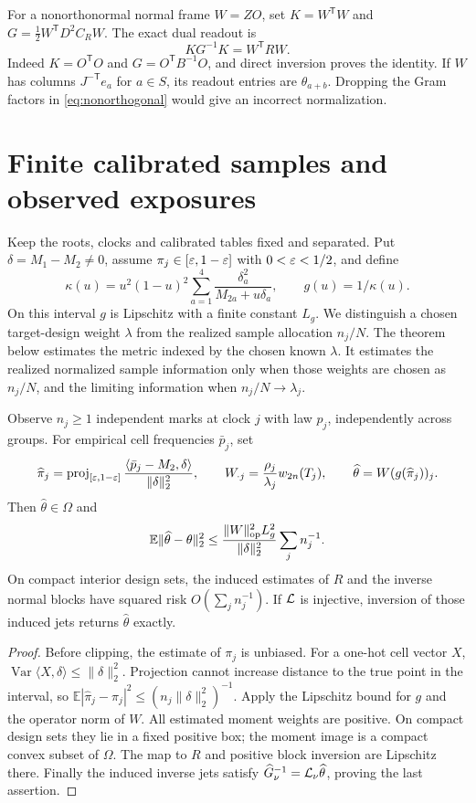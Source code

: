 For a nonorthonormal normal frame $W=ZO$, set $K=W^{\mathsf T}W$ and $G=\tfrac12W^{\mathsf T}D^2C_RW$. The exact dual readout is
\begin{equation}\label{eq:nonorthogonal}
 KG^{-1}K=W^{\mathsf T}RW.
\end{equation}
Indeed $K=O^{\mathsf T}O$ and $G=O^{\mathsf T}B^{-1}O$, and direct inversion proves the identity. If $W$ has columns $J^{-\mathsf T}e_a$ for $a\in S$, its readout entries are $\theta_{a+b}$. Dropping the Gram factors in \eqref{eq:nonorthogonal} would give an incorrect normalization.

\section{Finite calibrated samples and observed exposures}\label{app:raw}
Keep the roots, clocks and calibrated tables fixed and separated. Put $\delta=M_1-M_2\ne0$, assume $\pi_j\in[\varepsilon,1-\varepsilon]$ with $0<\varepsilon<1/2$, and define
\[
 \kappa(u)=u^2(1-u)^2\sum_{a=1}^4\frac{\delta_a^2}{M_{2a}+u\delta_a},\qquad g(u)=1/\kappa(u).
\]
On this interval $g$ is Lipschitz with a finite constant $L_g$. We distinguish a chosen target-design weight $\lambda$ from the realized sample allocation $n_j/N$. The theorem below estimates the metric indexed by the chosen known $\lambda$. It estimates the realized normalized sample information only when those weights are chosen as $n_j/N$, and the limiting information when $n_j/N\to\lambda_j$.
\begin{theorem}\label{thm:raw}
Observe $n_j\ge1$ independent marks at clock $j$ with law $p_j$, independently across groups. For empirical cell frequencies $\bar p_j$, set
\[
 \widehat\pi_j=\operatorname{proj}_{[\varepsilon,1-\varepsilon]}
     \frac{\langle\bar p_j-M_2,\delta\rangle}{\|\delta\|_2^2},\qquad
 W_{\cdot j}=\frac{\rho_j}{\lambda_j}w_{2n}(T_j),\qquad
 \widehat\theta=W(g(\widehat\pi_j))_j.
\]
Then $\widehat\theta\in\Omega$ and
\begin{equation}\label{eq:rawrisk}
 \mathbb E\|\widehat\theta-\theta\|_2^2
  \le\frac{\|W\|_{\rm op}^2L_g^2}{\|\delta\|_2^2}\sum_jn_j^{-1}.
\end{equation}
On compact interior design sets, the induced estimates of $R$ and the inverse normal blocks have squared risk $O(\sum_jn_j^{-1})$. If $\mathcal L$ is injective, inversion of those induced jets returns $\widehat\theta$ exactly.
\end{theorem}
\begin{proof}
Before clipping, the estimate of $\pi_j$ is unbiased. For a one-hot cell vector $X$, $\operatorname{Var}\langle X,\delta\rangle\le\|\delta\|_2^2$. Projection cannot increase distance to the true point in the interval, so $\mathbb E|\widehat\pi_j-\pi_j|^2\le(n_j\|\delta\|_2^2)^{-1}$. Apply the Lipschitz bound for $g$ and the operator norm of $W$. All estimated moment weights are positive. On compact design sets they lie in a fixed positive box; the moment image is a compact convex subset of $\Omega$. The map to $R$ and positive block inversion are Lipschitz there. Finally the induced inverse jets satisfy $\widehat G_\nu^{-1}=\mathcal L_\nu\widehat\theta$, proving the last assertion.
\end{proof}

